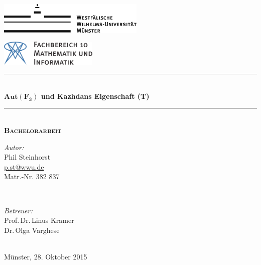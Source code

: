 \begin{titlepage}
	\newcommand{\HRule}{\rule{\linewidth}{0.8mm}}

	\center
 
	\begin{minipage}{0.4\textwidth}
	\begin{flushleft}
	\includegraphics[height=1.5cm,keepaspectratio]{../img/wwulogo.pdf}\\[1cm]
	\end{flushleft}
	\end{minipage}
	\hfill
	\begin{minipage}{0.4\textwidth}
	\begin{flushright}
	\vspace*{0.3cm}
	\includegraphics[height=1.2cm,keepaspectratio]{../img/fb10logo.pdf} \
	\end{flushright}
	\end{minipage}

	\vspace{2cm}
	
	\HRule \\[0.8cm]
	{ \huge \sffamily\bfseries $\mathbf{Aut}\boldsymbol{(F_3)}$ und Kazhdans Eigenschaft (T)}\\[0.4cm] %
	\HRule \\[1cm]
 
	\textsc{\LARGE \textbf{Bachelorarbeit}}\\[5cm]

	\vfill

	\begin{minipage}{0.4\textwidth}
	\begin{flushleft} \large
	\emph{Autor:}\\
	Phil Steinhorst\\
	\url{p.st@wwu.de}\\
	Matr.-Nr. 382 837
	\end{flushleft}
	\end{minipage}
	~
	\begin{minipage}{0.4\textwidth}
	\begin{flushright} \large
	\emph{Betreuer:} \\
	Prof.\,Dr.\,Linus Kramer\\
	Dr.\,Olga Varghese\\
	\phantom{bla}
	\end{flushright}
	\end{minipage}\\[2cm]

	{\large Münster, 28. Oktober 2015}
\end{titlepage}
